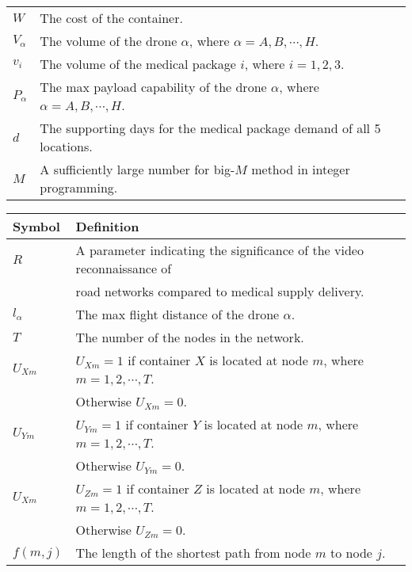 \documentclass{mcmthesis}
\begin{document}
\begin{tabular}{ll}
	 $W$& The cost of the container.\\
	
	 $V_\alpha$& The volume of the drone $\alpha$, where $\alpha=A,B,\cdots,H$.\\
	
	 $v_i$& The volume of the medical package $i$, where $i=1,2,3$.\\
	
	 $P_\alpha$& The max payload capability of the drone $\alpha$, where $\alpha=A,B,\cdots,H$.\\
	
	 $d$& The supporting days for the medical package demand of all 5 locations.\\
	
	 $M$& A sufficiently large number for big-$M$ method in integer programming.\\ 
	\hline
\end{tabular}


\begin{tabular}{ll}
	\hline
	Symbol&  Definition\\
	\hline	 
	 $R$& A parameter indicating the significance of the video reconnaissance of\\
	 & road networks compared to medical supply delivery. \\
	 
	 $l_\alpha$& The max flight distance of the drone $\alpha$.\\
	 
	 $T$& The number of the nodes in the network.\\
	 
	 $U_{Xm}$& $U_{Xm}=1$ if container $X$ is located at node $m$, where $m=1,2,\cdots,T$.\\ & Otherwise $U_{Xm}=0$.\\
	 
	 $U_{Ym}$& $U_{Ym}=1$ if container $Y$ is located at node $m$, where $m=1,2,\cdots,T$.\\ &Otherwise $U_{Ym}=0$.\\
	 
	 $U_{Xm}$& $U_{Zm}=1$ if container $Z$ is located at node $m$, where $m=1,2,\cdots,T$.\\ &Otherwise $U_{Zm}=0$.\\
	 
	$f(m,j)$& The length of the shortest path from node $m$ to node $j$.\\
	\hline
\end{tabular}
\end{document}
